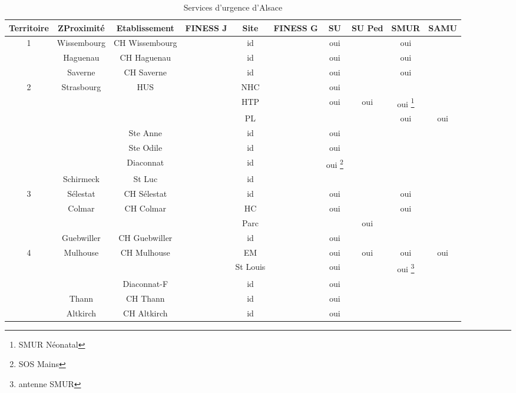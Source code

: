 \documentclass[12pt,english,french,twoside]{report}\usepackage[]{graphicx}\usepackage[]{color}
\providecommand{\tabularnewline}{\\} %
\begin{document}
\begin{landscape}
\begin{table}
\begin{center}
\begin{tabular}{|c|c|c|c|c|c|c|c|c|c|}
\hline 
Territoire & ZProximité & Etablissement & FINESS J & Site & FINESS G & SU & SU Ped & SMUR & SAMU\tabularnewline
\hline 
\hline 
 \multirow{3}{*}{1} & Wissembourg & CH Wissembourg &  & id &  & oui &  & oui & \tabularnewline
\cline{2-10} 
 & Haguenau & CH Haguenau &  & id &  & oui &  & oui & \tabularnewline
\cline{2-10} 
 & Saverne & CH Saverne &  & id &  & oui &  & oui & \tabularnewline
\hline 
\multirow{7}{*}{2} & \multirow{6}{*}{Strasbourg} & \multirow{3}{*}{HUS} &  & NHC &  & oui &  &  & \tabularnewline
\cline{4-10} 
 &  &  &  & HTP &  & oui & oui & oui%
\footnote{SMUR Néonatal%
} & \tabularnewline
\cline{4-10} 
 &  &  &  & PL &  &  &  & oui & oui\tabularnewline
\cline{3-10} 
 &  & Ste Anne &  & id &  & oui &  &  & \tabularnewline
\cline{3-10} 
 &  & Ste Odile &  & id &  & oui &  &  & \tabularnewline
\cline{3-10} 
 &  & Diaconnat &  & id &  & oui%
\footnote{SOS Mains%
} &  &  & \tabularnewline
\cline{2-10} 
 & Schirmeck & St Luc &  & id &  &  &  &  & \tabularnewline
\hline 
\multirow{4}{*}{3} & Sélestat & CH Sélestat &  & id &  & oui &  & oui & \tabularnewline
\cline{2-10} 
 & \multirow{2}{*}{Colmar} & \multirow{2}{*}{CH Colmar} &  & HC &  & oui &  & oui & \tabularnewline
\cline{4-10} 
 &  &  &  & Parc &  &  & oui &  & \tabularnewline
\cline{2-10} 
 & Guebwiller & CH Guebwiller &  & id &  & oui &  &  & \tabularnewline
\hline 
\multirow{5}{*}{4} & \multirow{3}{*}{Mulhouse} & \multirow{2}{*}{CH Mulhouse} &  & EM &  & oui & oui & oui & oui\tabularnewline
\cline{4-10} 
 &  &  &  & St Louis &  & oui &  & oui%
\footnote{antenne SMUR%
} & \tabularnewline
\cline{3-10} 
 &  & Diaconnat-F &  & id &  & oui &  &  & \tabularnewline
\cline{2-10} 
 & Thann & CH Thann &  & id &  & oui &  &  & \tabularnewline
\cline{2-10} 
 & Altkirch & CH Altkirch &  & id &  & oui &  &  & \tabularnewline
\hline
\end{tabular}
 \caption[Structures d'urgence]{Services d'urgence d'Alsace}

\label{tab:sualsace}
\end{center}
\end{table}
\end{landscape}
\end{document}
